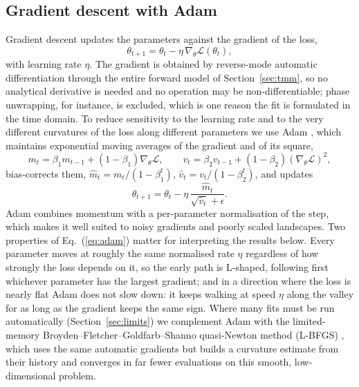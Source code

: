 \documentclass{optica-article}
\newcommand{\Lt}{\mathcal{L}}
\begin{document}
\subsection{Gradient descent with Adam}
Gradient descent updates the parameters against the gradient of the loss,
\begin{equation}
  \theta_{t+1}=\theta_t-\eta\,\nabla_\theta\Lt(\theta_t),
\end{equation}
with learning rate $\eta$. The gradient is obtained by reverse-mode automatic differentiation \cite{Baydin2018} through the entire forward model of Section~\ref{sec:tmm}, so no analytical derivative is needed and no operation may be non-differentiable; phase unwrapping, for instance, is excluded, which is one reason the fit is formulated in the time domain. To reduce sensitivity to the learning rate and to the very different curvatures of the loss along different parameters we use Adam \cite{Kingma2017}, which maintains exponential moving averages of the gradient and of its square,
\begin{equation}
  m_t=\beta_1 m_{t-1}+(1-\beta_1)\nabla_\theta\Lt,\qquad v_t=\beta_2 v_{t-1}+(1-\beta_2)\left(\nabla_\theta\Lt\right)^2,
\end{equation}
bias-corrects them, $\hat m_t=m_t/(1-\beta_1^t)$, $\hat v_t=v_t/(1-\beta_2^t)$, and updates
\begin{equation}
  \theta_{t+1}=\theta_t-\eta\,\frac{\hat m_t}{\sqrt{\hat v_t}+\epsilon}.
  \label{eq:adam}
\end{equation}
Adam combines momentum with a per-parameter normalisation of the step, which makes it well suited to noisy gradients and poorly scaled landscapes. Two properties of Eq.~(\ref{eq:adam}) matter for interpreting the results below. Every parameter moves at roughly the same normalised rate $\eta$ regardless of how strongly the loss depends on it, so the early path is L-shaped, following first whichever parameter has the largest gradient; and in a direction where the loss is nearly flat Adam does not slow down: it keeps walking at speed $\eta$ along the valley for as long as the gradient keeps the same sign. Where many fits must be run automatically (Section~\ref{sec:limits}) we complement Adam with the limited-memory Broyden--Fletcher--Goldfarb--Shanno quasi-Newton method (L-BFGS) \cite{Liu1989,Nocedal2006}, which uses the same automatic gradients but builds a curvature estimate from their history and converges in far fewer evaluations on this smooth, low-dimensional problem.
\end{document}
